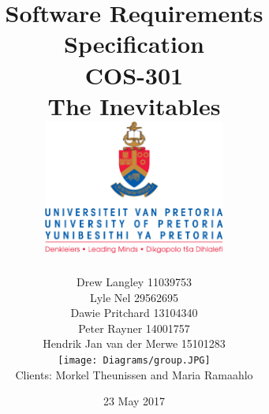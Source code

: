 \documentclass{article}
\title{ Software Requirements Specification \\ COS-301 \\ The Inevitables \\[0.5cm] \includegraphics[width=6cm]{Diagrams/front-page.jpg}}
\author{Drew Langley \hfill 11039753 \\ Lyle Nel \hfill 29562695 \\ Dawie Pritchard \hfill 13104340 \\  Peter Rayner \hfill 14001757\\ Hendrik Jan van der Merwe \hfill 15101283 \\ [1cm]\texttt{[image: Diagrams/group.JPG]}\\ [1cm] Clients: Morkel Theunissen and Maria Ramaahlo }
\date{23 May 2017}
\begin{document}
\maketitle
\pagebreak
\tableofcontents
\pagebreak


\newpage

\newpage

\newpage

\newpage
\end{document}
